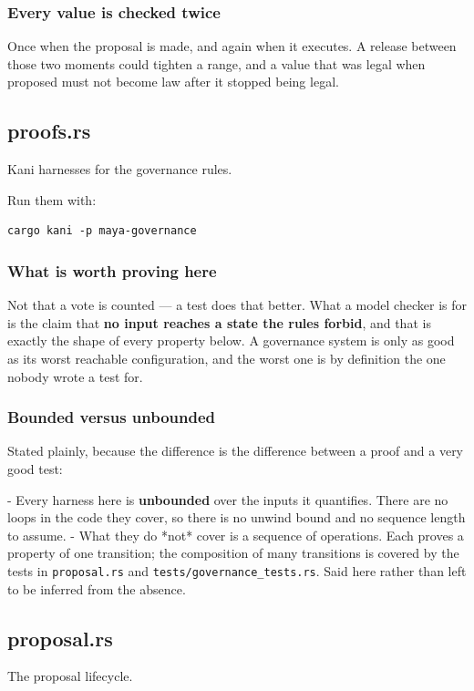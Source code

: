 \documentclass[11pt,a4paper]{article}
\begin{document}
\subsubsection{Every value is checked twice}

Once when the proposal is made, and again when it executes. A release
between those two moments could tighten a range, and a value that was legal
when proposed must not become law after it stopped being legal.

\subsection{proofs.rs}
Kani harnesses for the governance rules.

Run them with:

\begin{verbatim}
cargo kani -p maya-governance
\end{verbatim}

\subsubsection{What is worth proving here}

Not that a vote is counted — a test does that better. What a model checker is
for is the claim that \textbf{no input reaches a state the rules forbid}, and that
is exactly the shape of every property below. A governance system is only as
good as its worst reachable configuration, and the worst one is by definition
the one nobody wrote a test for.

\subsubsection{Bounded versus unbounded}

Stated plainly, because the difference is the difference between a proof and
a very good test:

- Every harness here is \textbf{unbounded} over the inputs it quantifies. There
  are no loops in the code they cover, so there is no unwind bound and no
  sequence length to assume.
- What they do *not* cover is a sequence of operations. Each proves a
  property of one transition; the composition of many transitions is covered
  by the tests in \texttt{proposal.rs} and \texttt{tests/governance\_tests.rs}. Said here
  rather than left to be inferred from the absence.

\subsection{proposal.rs}
The proposal lifecycle.
\end{document}
